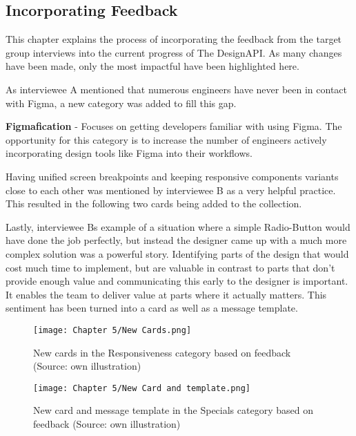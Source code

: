 \newpage
\subsection{Incorporating Feedback}
This chapter explains the process of incorporating the feedback from the target group interviews
into the current progress of The DesignAPI. As many changes have been made, only the most impactful
have been highlighted here.

As interviewee A mentioned that numerous engineers have never been in contact with Figma, a new
category was added to fill this gap.

\textbf{Figmafication} - Focuses on getting developers familiar with using Figma. The
opportunity for this category is to increase the number of engineers actively
incorporating design tools like Figma into their workflows.

Having unified screen breakpoints and keeping responsive components variants close to each other was
mentioned by interviewee B as a very helpful practice. This resulted in the following two cards
being added to the collection.

Lastly, interviewee Bs example of a situation where a simple Radio-Button would have done the job
perfectly, but instead the designer came up with a much more complex solution was a powerful story.
Identifying parts of the design that would cost much time to implement, but are valuable in contrast
to parts that don't provide enough value and communicating this early to the designer is important.
It enables the team to deliver value at parts where it actually matters. This sentiment has been
turned into a card as well as a message template.

\begin{figure}[H]
    \centering
    \texttt{[image: Chapter 5/New Cards.png]}
    \caption{New cards in the Responsiveness category based on feedback (Source: own illustration)}
\end{figure}

\begin{figure}[H]
    \centering
    \texttt{[image: Chapter 5/New Card and template.png]}
    \caption{New card and message template in the Specials category based on feedback (Source: own illustration)}
\end{figure}
